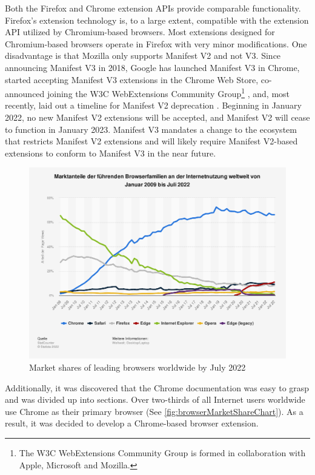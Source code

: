 Both the Firefox and Chrome extension APIs provide comparable functionality. Firefox's extension technology is, to a large extent, compatible with the extension API utilized by Chromium-based browsers. Most extensions designed for Chromium-based browsers operate in Firefox with very minor modifications. One disadvantage is that Mozilla only supports Manifest V2 and not V3. Since announcing Manifest V3 in 2018, Google has launched Manifest V3 in Chrome, started accepting Manifest V3 extensions in the Chrome Web Store, co-announced joining the W3C WebExtensions Community Group\footnote{The W3C WebExtensions Community Group is formed in collaboration with Apple, Microsoft and Mozilla.} , and, most recently, laid out a timeline for Manifest V2 deprecation \autocite{alexei2021manifest}. Beginning in January 2022, no new Manifest V2 extensions will be accepted, and Manifest V2 will cease to function in January 2023. Manifest V3 mandates a change to the ecosystem that restricts Manifest V2 extensions and will likely require Manifest V2-based extensions to conform to Manifest V3 in the near future.

\begin{figure}[H]
  \includegraphics[width=\textwidth]{assets/statistic_id157944_marktanteile-fuehrender-browser-weltweit-bis-juli-2022.png}
  \caption{Market shares of leading browsers worldwide by July 2022}
  \label{fig:browserMarketShareChart}
\end{figure}

Additionally, it was discovered that the Chrome documentation was easy to grasp and was divided up into sections. Over two-thirds of all Internet users worldwide use Chrome as their primary browser (See \autoref{fig:browserMarketShareChart}). As a result, it was decided to develop a Chrome-based browser extension.

